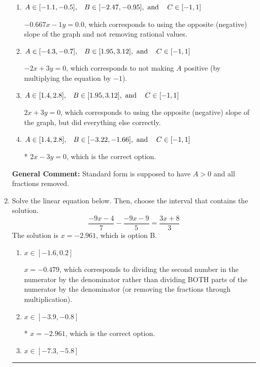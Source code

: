 \documentclass{extbook}[14pt]
\newcommand{\litem}[1]{\item #1

\rule{\textwidth}{0.4pt}}
\begin{document}
\begin{enumerate}
{\begin{enumerate}[label=\Alph*.]
 $-0.667x + 1y = -0.0$, which corresponds to not removing rational values for Standard Form.
\item \( A \in [-1.1, -0.5], \hspace{3mm} B \in [-2.47, -0.95], \text{ and } \hspace{3mm} C \in [-1, 1] \)

 $-0.667x - 1y = 0.0$, which corresponds to using the opposite (negative) slope of the graph and not removing rational values.
\item \( A \in [-4.3, -0.7], \hspace{3mm} B \in [1.95, 3.12], \text{ and } \hspace{3mm} C \in [-1, 1] \)

 $-2x + 3y = 0$, which corresponds to not making $A$ positive (by multiplying the equation by $-1$).
\item \( A \in [1.4, 2.8], \hspace{3mm} B \in [1.95, 3.12], \text{ and } \hspace{3mm} C \in [-1, 1] \)

 $2x + 3y = 0$, which corresponds to using the opposite (negative) slope of the graph, but did everything else correctly.
\item \( A \in [1.4, 2.8], \hspace{3mm} B \in [-3.22, -1.66], \text{ and } \hspace{3mm} C \in [-1, 1] \)

* $2x - 3y = 0$, which is the correct option.
\end{enumerate}

\textbf{General Comment:} Standard form is supposed to have $A > 0$ and all fractions removed.
}
\litem{
Solve the linear equation below. Then, choose the interval that contains the solution.
\[ \frac{-9x -4}{7} - \frac{-9x -9}{5} = \frac{3x + 8}{3} \]The solution is \( x = -2.961 \), which is option B.\begin{enumerate}[label=\Alph*.]
\item \( x \in [-1.6, 0.2] \)

 $x = -0.479$, which corresponds to dividing the second number in the numerator by the denominator rather than dividing BOTH parts of the numerator by the denominator (or removing the fractions through multiplication).
\item \( x \in [-3.9, -0.8] \)

* $x = -2.961$, which is the correct option.
\item \( x \in [-7.3, -5.8] \)


\end{enumerate}}
\end{enumerate}
\end{document}
